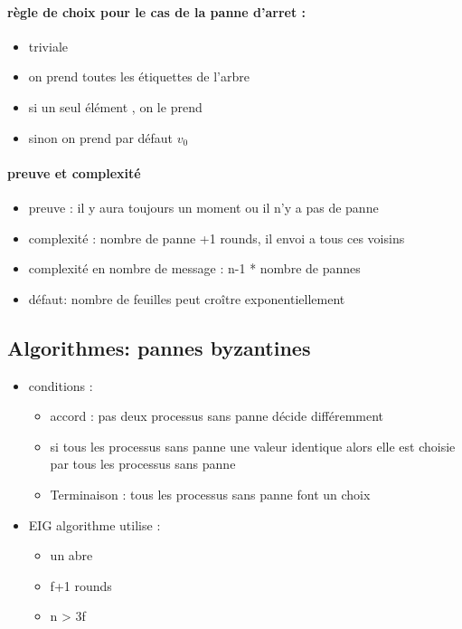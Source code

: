\documentclass{article}
\begin{document}
\paragraph{règle de choix pour le cas de la panne d'arret : }
\begin{itemize}
\item triviale
\item on prend toutes les étiquettes de l'arbre
\item si un seul élément , on le prend
\item sinon on prend par défaut $v_0$
\end{itemize}
\paragraph{preuve et complexité}
\begin{itemize}
\item preuve  :  il y aura toujours un moment ou il n'y a pas de panne
\item complexité : nombre de panne +1 rounds, il envoi a tous ces voisins
\item complexité en nombre de message  : n-1 * nombre de pannes
\item défaut:  nombre de feuilles peut croître exponentiellement
\end{itemize}

\subsection{Algorithmes:  pannes byzantines}
\begin{itemize}
\item conditions : 
\begin{itemize}
\item accord : pas deux processus sans panne décide différemment
\item si tous les processus sans panne une valeur identique alors elle est choisie par tous les processus sans panne
\item Terminaison : tous les processus sans panne font un choix
\end{itemize}
\item EIG algorithme utilise : 
\begin{itemize}
\item un abre
\item f+1 rounds
\item n > 3f
\end{itemize}
\end{itemize}
\end{document}
